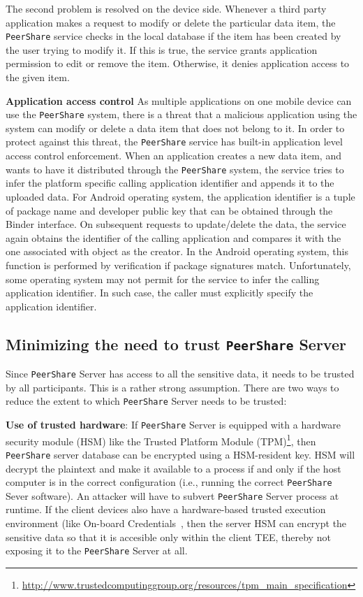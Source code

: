 \documentclass[twocolumn,a4paper,10pt]{article}
\newcommand{\peershare}{\texttt{PeerShare}\xspace}
\begin{document}
The second problem is resolved on the device side. Whenever a third party application makes a request to modify or delete the particular data item, the \peershare service checks in the local database if the item has been created by the user trying to modify it. If this is true, the service grants application permission to edit or remove the item. Otherwise, it denies application access to the given item.

\textbf{Application access control}
As multiple applications on one mobile device can use the \peershare system, there is a threat that a malicious application using the system can modify or delete a data item that does not belong to it. In order to protect against this threat, the \peershare service has built-in application level access control enforcement. When an application creates a new data item, and wants to have it distributed through the \peershare system, the service tries to infer the platform specific calling application identifier and appends it to the uploaded data. For Android operating system, the application identifier is a tuple of package name and developer public key that can be obtained through the Binder interface. On subsequent requests to update/delete the data, the service again obtains the identifier of the calling application and compares it with the one associated with object as the creator. In the Android operating system, this function is performed by verification if package signatures match. Unfortunately, some operating system may not permit for the service to infer the calling application identifier. In such case, the caller must explicitly specify the application identifier.

\subsection{Minimizing the need to trust \peershare Server}
\label{:minimizing_trust}

Since \peershare Server has access to all the sensitive data, it
needs to be trusted by all participants. 
This is a rather strong assumption.  There are two ways to reduce the
extent to which \peershare Server needs to be trusted:

\noindent\textbf{Use of trusted hardware}:
If \peershare Server is equipped with a hardware security module (HSM) like
the Trusted Platform Module
(TPM)\footnote{\url{http://www.trustedcomputinggroup.org/resources/tpm_main_specification}},
then \peershare server database can be encrypted using a
HSM-resident key.  HSM will decrypt the plaintext and make it
available to a process if and only if the host computer is in the
correct configuration (i.e., running the correct \peershare
Sever software). An attacker will have to subvert \peershare Server process
at runtime.  If the client devices also have a hardware-based trusted
execution environment (like On-board
Credentials~\cite{DBLP:conf/ccs/KostiainenEAR09}, then the server
HSM can encrypt the sensitive data so that it is accesible only within
the client TEE, thereby not exposing it to the \peershare Server at
all.
\end{document}
